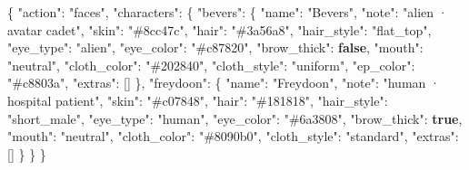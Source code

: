 \documentclass[
  11pt,
]{book}
\newenvironment{Shaded}{}{}
\newcommand{\DataTypeTok}[1]{\textcolor[rgb]{0.56,0.13,0.00}{#1}}
\newcommand{\FunctionTok}[1]{\textcolor[rgb]{0.02,0.16,0.49}{#1}}
\newcommand{\KeywordTok}[1]{\textcolor[rgb]{0.00,0.44,0.13}{\textbf{#1}}}
\newcommand{\OtherTok}[1]{\textcolor[rgb]{0.00,0.44,0.13}{#1}}
\newcommand{\StringTok}[1]{\textcolor[rgb]{0.25,0.44,0.63}{#1}}
\begin{document}
\begin{Shaded}
\begin{Highlighting}[]
\FunctionTok{\{}
  \DataTypeTok{"action"}\FunctionTok{:} \StringTok{"faces"}\FunctionTok{,}
  \DataTypeTok{"characters"}\FunctionTok{:} \FunctionTok{\{}
    \DataTypeTok{"bevers"}\FunctionTok{:} \FunctionTok{\{}
      \DataTypeTok{"name"}\FunctionTok{:}        \StringTok{"Bevers"}\FunctionTok{,}
      \DataTypeTok{"note"}\FunctionTok{:}        \StringTok{"alien · avatar cadet"}\FunctionTok{,}
      \DataTypeTok{"skin"}\FunctionTok{:}        \StringTok{"\#8cc47c"}\FunctionTok{,}
      \DataTypeTok{"hair"}\FunctionTok{:}        \StringTok{"\#3a56a8"}\FunctionTok{,}
      \DataTypeTok{"hair\_style"}\FunctionTok{:}  \StringTok{"flat\_top"}\FunctionTok{,}
      \DataTypeTok{"eye\_type"}\FunctionTok{:}    \StringTok{"alien"}\FunctionTok{,}
      \DataTypeTok{"eye\_color"}\FunctionTok{:}   \StringTok{"\#c87820"}\FunctionTok{,}
      \DataTypeTok{"brow\_thick"}\FunctionTok{:}  \KeywordTok{false}\FunctionTok{,}
      \DataTypeTok{"mouth"}\FunctionTok{:}       \StringTok{"neutral"}\FunctionTok{,}
      \DataTypeTok{"cloth\_color"}\FunctionTok{:} \StringTok{"\#202840"}\FunctionTok{,}
      \DataTypeTok{"cloth\_style"}\FunctionTok{:} \StringTok{"uniform"}\FunctionTok{,}
      \DataTypeTok{"ep\_color"}\FunctionTok{:}    \StringTok{"\#c8803a"}\FunctionTok{,}
      \DataTypeTok{"extras"}\FunctionTok{:}      \OtherTok{[]}
    \FunctionTok{\},}
    \DataTypeTok{"freydoon"}\FunctionTok{:} \FunctionTok{\{}
      \DataTypeTok{"name"}\FunctionTok{:}        \StringTok{"Freydoon"}\FunctionTok{,}
      \DataTypeTok{"note"}\FunctionTok{:}        \StringTok{"human · hospital patient"}\FunctionTok{,}
      \DataTypeTok{"skin"}\FunctionTok{:}        \StringTok{"\#c07848"}\FunctionTok{,}
      \DataTypeTok{"hair"}\FunctionTok{:}        \StringTok{"\#181818"}\FunctionTok{,}
      \DataTypeTok{"hair\_style"}\FunctionTok{:}  \StringTok{"short\_male"}\FunctionTok{,}
      \DataTypeTok{"eye\_type"}\FunctionTok{:}    \StringTok{"human"}\FunctionTok{,}
      \DataTypeTok{"eye\_color"}\FunctionTok{:}   \StringTok{"\#6a3808"}\FunctionTok{,}
      \DataTypeTok{"brow\_thick"}\FunctionTok{:}  \KeywordTok{true}\FunctionTok{,}
      \DataTypeTok{"mouth"}\FunctionTok{:}       \StringTok{"neutral"}\FunctionTok{,}
      \DataTypeTok{"cloth\_color"}\FunctionTok{:} \StringTok{"\#8090b0"}\FunctionTok{,}
      \DataTypeTok{"cloth\_style"}\FunctionTok{:} \StringTok{"standard"}\FunctionTok{,}
      \DataTypeTok{"extras"}\FunctionTok{:}      \OtherTok{[]}
    \FunctionTok{\}}
  \FunctionTok{\}}
\FunctionTok{\}}
\end{Highlighting}
\end{Shaded}
\end{document}
